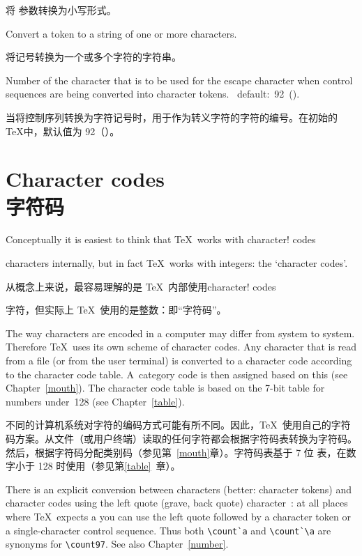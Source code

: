 \begin{inventory}
      将  参数转换为小写形式。
\item [\cs{string}]
      Convert a token to a string of one or more characters.

      将记号转换为一个或多个字符的字符串。
\item [\cs{escapechar}]
      Number of the character that is to be used 
      for the escape character
      when control sequences are being converted
      into character tokens. \IniTeX\ default:~92~(\cs{}).

      当将控制序列转换为字符记号时，用于作为转义字符的字符的编号。在初始的 \TeX 中，默认值为 92（\cs{}）。
\end{inventory}


\section{Character codes\\字符码}
\label{char:code}

Conceptually it is easiest to think that \TeX\ works with
\term character! codes\par
characters internally, but in fact
\TeX\ works with integers: the `character codes'. 

从概念上来说，最容易理解的是 \TeX\ 内部使用\term character! codes\par 字符，但实际上 \TeX\ 使用的是整数：即“字符码”。

The way characters are encoded in a computer may differ
from system to system.
Therefore \TeX\ uses its own scheme of character codes.
Any character that is read from a file (or from the user terminal)
is converted to a character code according to the
character code table.
A~category code is then assigned based on this (see Chapter~\ref{mouth}).
The character code table is based on the 7-bit \ascii{} table
for numbers under~128 (see Chapter~\ref{table}).

不同的计算机系统对字符的编码方式可能有所不同。因此，\TeX\ 使用自己的字符码方案。从文件（或用户终端）读取的任何字符都会根据字符码表转换为字符码。然后，根据字符码分配类别码（参见第~\ref{mouth}章）。字符码表基于 7 位 \ascii{} 表，在数字小于 128 时使用（参见第\ref{table}~章）。

There is an explicit conversion between characters
(better:  character tokens)
and  character codes  using the left quote (grave, back quote)
character~:
at all places where \TeX\ expects a  you
can use the left quote followed by a character
token or
a single-character control sequence.
Thus both \verb.\count`a. and \verb.\count`\a. are synonyms
\awp
for \verb.\count97.. See also Chapter~\ref{number}.

